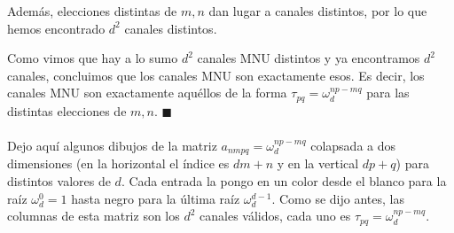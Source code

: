 Además, elecciones distintas de $m,n$ dan lugar a canales distintos, por lo que hemos encontrado $d^2$ canales distintos. 

Como vimos que hay a lo sumo $d^2$ canales MNU distintos y ya encontramos $d^2$ canales, concluimos que los canales MNU son exactamente esos. Es decir, los canales MNU son exactamente aquéllos de la forma $\tau_{pq}  =\omega_d^{np-mq}$ para las distintas elecciones de $m,n$. $\blacksquare$ \\ \\

Dejo aquí algunos dibujos de la matriz $a_{nmpq} = \omega_d^{np-mq}$ colapsada a dos dimensiones (en la horizontal el índice es $dm+n$ y en la vertical $dp+q$) para distintos valores de $d$. Cada entrada la pongo en un color desde el blanco para la raíz $\omega_d^0 = 1$ hasta negro para la última raíz $\omega_d^{d-1}$. Como se dijo antes, las columnas de esta matriz son los $d^2$ canales válidos, cada uno es $\tau_{pq} = \omega_d^{np-mq}$. 


